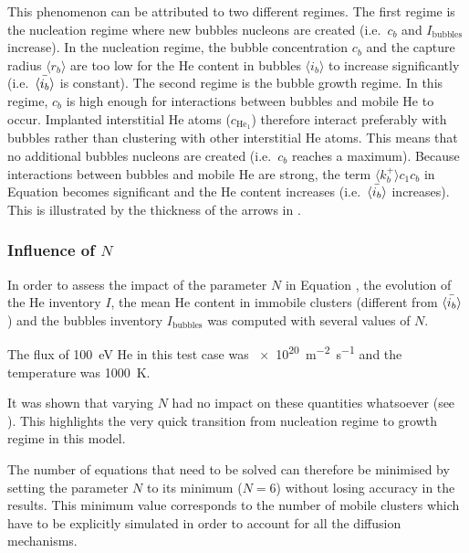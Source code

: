 This phenomenon can be attributed to two different regimes.
The first regime is the nucleation regime where new bubbles nucleons are created (i.e.\ $c_b$ and $I_\mathrm{bubbles}$ increase).
In the nucleation regime, the bubble concentration $c_b$ and the capture radius $\langle r_b \rangle$ are too low for the He content in bubbles $\langle i_b \rangle$ to increase significantly (i.e.\ $\Bar{\langle i_b \rangle}$ is constant).
The second regime is the bubble growth regime.
In this regime, $c_b$ is high enough for interactions between bubbles and mobile He to occur.
Implanted interstitial He atoms ($c_{\mathrm{He}_1}$) therefore interact preferably with bubbles rather than clustering with other interstitial He atoms.
This means that no additional bubbles nucleons are created (i.e.\ $c_b$ reaches a maximum).
Because interactions between bubbles and mobile He are strong, the term $\langle k_b^+ \rangle c_1 c_b$ in Equation  becomes significant and the He content increases (i.e.\ $\Bar{\langle i_b \rangle}$ increases).
This is illustrated by the thickness of the arrows in .


\subsubsection{Influence of $N$} 
In order to assess the impact of the parameter $N$ in Equation , the evolution of the He inventory $I$, the mean He content in immobile clusters (different from $\Bar{\langle i_b \rangle}$) and the bubbles inventory $I_\mathrm{bubbles}$ was computed with several values of $N$.

The flux of \SI{100}{eV} He in this test case was \SI{e20}{m^{-2} s^{-1}} and the temperature was \SI{1000}{K}. 

It was shown that varying $N$ had no impact on these quantities whatsoever (see ).
This highlights the very quick transition from nucleation regime to growth regime in this model.

The number of equations that need to be solved can therefore be minimised by setting the parameter $N$ to its minimum ($N=6$) without losing accuracy in the results.
This minimum value corresponds to the number of mobile clusters which have to be explicitly simulated in order to account for all the diffusion mechanisms.

